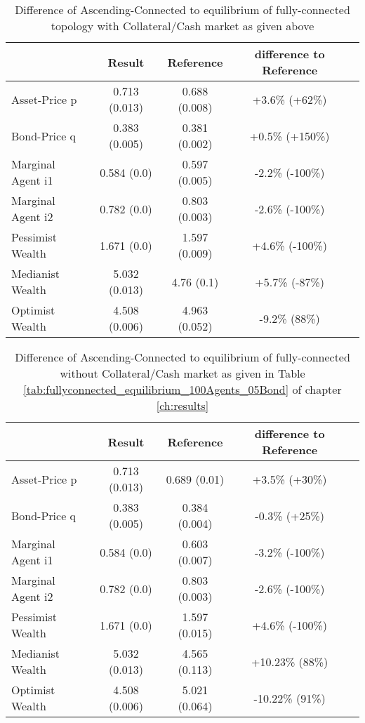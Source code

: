\documentclass[Bachelorarbeit.tex]{subfiles}
\begin{document}
\begin{table}[H]
	\caption{Difference of Ascending-Connected to equilibrium of fully-connected topology with Collateral/Cash market as given above}
	\centering
	\begin{tabular} { l c c c r }
		& Result & Reference & difference to Reference \\
		\hline
		Asset-Price p & 0.713 (0.013) & 0.688 (0.008) & +3.6\% (+62\%) \\
		Bond-Price q & 0.383 (0.005) & 0.381 (0.002) & +0.5\% (+150\%) \\
		Marginal Agent i1 & 0.584 (0.0) & 0.597 (0.005) & -2.2\% (-100\%) \\
		Marginal Agent i2 & 0.782 (0.0) & 0.803 (0.003) & -2.6\% (-100\%) \\
		\hline
		Pessimist Wealth & 1.671 (0.0) & 1.597 (0.009) & +4.6\% (-100\%) \\
		Medianist Wealth & 5.032 (0.013) & 4.76 (0.1) & +5.7\% (-87\%) \\
		Optimist Wealth & 4.508 (0.006) & 4.963 (0.052) & -9.2\% (88\%) \\
		\hline
	\end{tabular}
\end{table}

\begin{table}[H]
	\caption{Difference of Ascending-Connected to equilibrium of fully-connected without Collateral/Cash market as given in Table \ref{tab:fullyconnected_equilibrium_100Agents_05Bond} of chapter \ref{ch:results}}
	\centering
	\begin{tabular} { l c c c r }
		& Result & Reference & difference to Reference \\
		\hline
		Asset-Price p & 0.713 (0.013) & 0.689 (0.01) & +3.5\% (+30\%) \\
		Bond-Price q & 0.383 (0.005) & 0.384 (0.004) & -0.3\% (+25\%) \\
		Marginal Agent i1 & 0.584 (0.0) & 0.603 (0.007) & -3.2\% (-100\%) \\
		Marginal Agent i2 & 0.782 (0.0) & 0.803 (0.003) & -2.6\% (-100\%) \\
		\hline
		Pessimist Wealth & 1.671 (0.0) & 1.597 (0.015) & +4.6\% (-100\%) \\
		Medianist Wealth & 5.032 (0.013) & 4.565 (0.113) & +10.23\% (88\%) \\
		Optimist Wealth & 4.508 (0.006) & 5.021 (0.064) & -10.22\% (91\%) \\
		\hline
	\end{tabular}
\end{table} 
\end{document}
